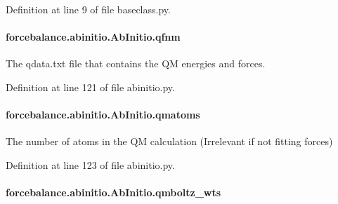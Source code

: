 Definition at line 9 of file baseclass.\-py.

\hypertarget{classforcebalance_1_1abinitio_1_1AbInitio_ac93db408472034937e79572bf872886c}{
\paragraph[{qfnm}]{\setlength{\rightskip}{0pt plus 5cm}forcebalance.\-abinitio.\-Ab\-Initio.\-qfnm\hspace{0.3cm}{\ttfamily [inherited]}}}\label{classforcebalance_1_1abinitio_1_1AbInitio_ac93db408472034937e79572bf872886c}


The qdata.\-txt file that contains the Q\-M energies and forces. 



Definition at line 121 of file abinitio.\-py.

\hypertarget{classforcebalance_1_1abinitio_1_1AbInitio_af0760b8d33ce9dd044ccbe68fba7a1be}{
\paragraph[{qmatoms}]{\setlength{\rightskip}{0pt plus 5cm}forcebalance.\-abinitio.\-Ab\-Initio.\-qmatoms\hspace{0.3cm}{\ttfamily [inherited]}}}\label{classforcebalance_1_1abinitio_1_1AbInitio_af0760b8d33ce9dd044ccbe68fba7a1be}


The number of atoms in the Q\-M calculation (Irrelevant if not fitting forces) 



Definition at line 123 of file abinitio.\-py.

\hypertarget{classforcebalance_1_1abinitio_1_1AbInitio_a06ec6b12d81791ca94f599f41e56335a}{
\paragraph[{qmboltz\-\_\-wts}]{\setlength{\rightskip}{0pt plus 5cm}forcebalance.\-abinitio.\-Ab\-Initio.\-qmboltz\-\_\-wts\hspace{0.3cm}{\ttfamily [inherited]}}}\label{classforcebalance_1_1abinitio_1_1AbInitio_a06ec6b12d81791ca94f599f41e56335a}


